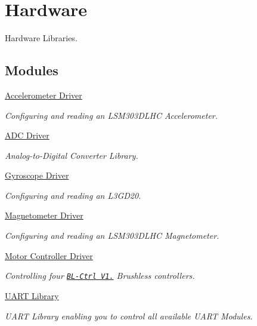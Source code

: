 \hypertarget{group___hardware}{\section{Hardware}
\label{group___hardware}
}


Hardware Libraries.  


\subsection*{Modules}
\begin{DoxyCompactItemize}
\item 
\hyperlink{group__acc}{Accelerometer Driver}
\begin{DoxyCompactList}\small\item\em Configuring and reading an L\-S\-M303\-D\-L\-H\-C Accelerometer. \end{DoxyCompactList}\item 
\hyperlink{group__adc}{A\-D\-C Driver}
\begin{DoxyCompactList}\small\item\em Analog-\/to-\/\-Digital Converter Library. \end{DoxyCompactList}\item 
\hyperlink{group__gyro}{Gyroscope Driver}
\begin{DoxyCompactList}\small\item\em Configuring and reading an L3\-G\-D20. \end{DoxyCompactList}\item 
\hyperlink{group__mag}{Magnetometer Driver}
\begin{DoxyCompactList}\small\item\em Configuring and reading an L\-S\-M303\-D\-L\-H\-C Magnetometer. \end{DoxyCompactList}\item 
\hyperlink{group__motor}{Motor Controller Driver}
\begin{DoxyCompactList}\small\item\em Controlling four \href{https://www.mikrocontroller.com/index.php?main_page=product_info&products_id=209}{\tt B\-L-\/\-Ctrl V1.} Brushless controllers. \end{DoxyCompactList}\item 
\hyperlink{group__uart}{U\-A\-R\-T Library}
\begin{DoxyCompactList}\small\item\em U\-A\-R\-T Library enabling you to control all available U\-A\-R\-T Modules. \end{DoxyCompactList}\item 

\end{DoxyCompactItemize}
